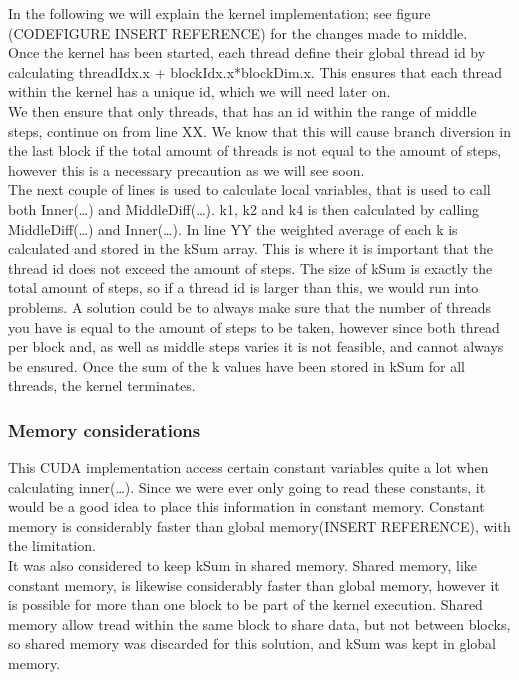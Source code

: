 In the following we will explain the kernel implementation; see figure (CODEFIGURE INSERT REFERENCE) for the changes made to middle. \\

Once the kernel has been started, each thread define their global thread id by calculating threadIdx.x + blockIdx.x*blockDim.x. This ensures that each thread within the kernel has a unique id, which we will need later on.\\

We then ensure that only threads, that has an id within the range of middle steps, continue on from line XX. We know that this will cause branch diversion in the last block if the total amount of threads is not equal to the amount of steps, however this is a necessary precaution as we will see soon.\\

The next couple of lines is used to calculate local variables, that is used to call both Inner(…) and MiddleDiff(…). k1, k2 and k4 is then calculated by calling MiddleDiff(…) and Inner(…). In line YY the weighted average of each k is calculated and stored in the kSum array. This is where it is important that the thread id does not exceed the amount of steps. The size of kSum is exactly the total amount of steps, so if a thread id is larger than this, we would run into problems. A solution could be to always make sure that the number of threads you have is equal to the amount of steps to be taken, however since both thread per block and, as well as middle steps varies it is not feasible, and cannot always be ensured. Once the sum of the k values have been stored in kSum for all threads, the kernel terminates.

\subsubsection{Memory considerations} \hfill
This CUDA implementation access certain constant variables quite a lot when calculating inner(…). Since we were ever only going to read these constants, it would be a good idea to place this information in constant memory. Constant memory is considerably faster than global memory(INSERT REFERENCE), with the limitation.\\

It was also considered to keep kSum in shared memory. Shared memory, like constant memory, is likewise considerably faster than global memory, however it is possible for more than one block to be part of the kernel execution. Shared memory allow tread within the same block to share data, but not between blocks, so shared memory was discarded for this solution, and kSum was kept in global memory.

